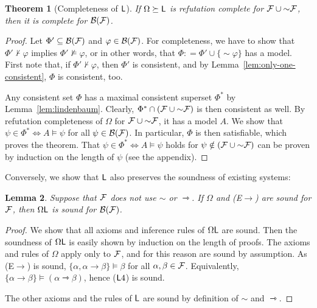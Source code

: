 \documentclass[a4paper,english,fleqn,11pt,final]{scrartcl}
\newcommand{\negg}{{\sim}}
\newcommand{\calB}{\protect\ensuremath{\mathcal{B}}}
\newcommand{\calF}{\protect\ensuremath{\mathcal{F}}}
\newcommand{\sfL}{\protect\ensuremath{\mathsf{L}}}
\providecommand{\dfn}{\mathrel{\mathop:}=}
\newcommand{\imp}{\rightarrow}
\newcommand{\timp}{\rightarrowtriangle}
\newcommand{\Deriv}[1]{{\normalfont\textsf{#1}}}
\theoremstyle{plain}
\newtheorem{theorem}{Theorem}[section]
\newtheorem{lemma}[theorem]{Lemma}
\theoremstyle{definition}
\begin{document}
\begin{theorem}[Completeness of $\sfL$]\label{thm:completeness-of-L}
If $\Omega \succeq \sfL$ is refutation complete for $\calF \cup \negg \calF$, then it is complete for $\calB(\calF)$.
\end{theorem}
\begin{proof}
Let $\Phi' \subseteq \calB(\calF)$ and $\varphi \in \calB(\calF)$.
For completeness, we have to show that $\Phi' \nvdash \varphi$ implies $\Phi' \nvDash \varphi$, or in other words, that $\Phi \dfn \Phi' \cup \{\negg\varphi\}$ has a model.
First note that, if $\Phi' \nvdash \varphi$, then $\Phi'$ is consistent, and by Lemma~\ref{lem:only-one-consistent}, $\Phi$ is consistent, too.




Any consistent set $\Phi$ has a maximal consistent superset $\Phi^*$ by Lemma~\ref{lem:lindenbaum}.
Clearly, $\Phi^* \cap (\calF \cup \negg \calF)$ is then consistent as well.
By refutation completeness of $\Omega$ for $\calF \cup \negg \calF$, it has a model $A$.
We show that $\psi \in \Phi^* \Leftrightarrow A\vDash \psi$ for all $\psi \in \calB(\calF)$.
In particular, $\Phi$ is then satisfiable, which proves the theorem.
That $\psi \in \Phi^* \Leftrightarrow A\vDash \psi$ holds for $\psi \notin (\calF \cup \negg \calF)$ can be proven by induction on the length of $\psi$ (see the appendix).
\end{proof}

Conversely, we show that $\sfL$ also preserves the soundness of existing systems:

\begin{lemma}
Suppose that $\calF$ does not use $\negg$ or $\timp$.
If $\Omega$ and \Deriv{(E$\imp$)} are sound for $\calF$, then $\Omega\sfL$ is sound for $\calB(\calF)$.
\end{lemma}
\begin{proof}
We show that all axioms and inference rules of $\Omega\sfL$ are sound.
Then the soundness of $\Omega\sfL$ is easily shown by induction on the length of proofs.
The axioms and rules of $\Omega$ apply only to $\calF$, and for this reason are sound by assumption.
As \Deriv{(E$\imp$)} is sound, $\{\alpha, \alpha\imp\beta\} \vDash \beta$ for all $\alpha,\beta \in \calF$.
Equivalently, $\{\alpha\imp\beta\}\vDash (\alpha \timp\beta)$, hence \Deriv{($\sfL4$)} is sound.

The other axioms and the rules of $\sfL$ are sound by definition of $\negg$ and $\timp$.
\end{proof}
\end{document}
